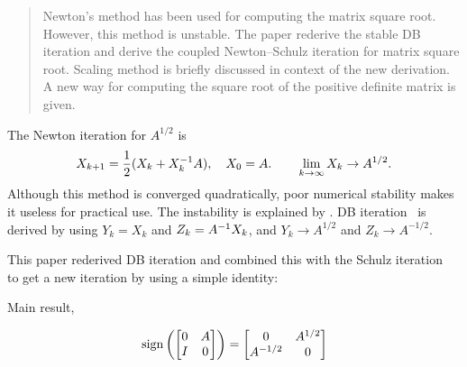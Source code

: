 \documentclass{article}
\begin{document}
\maketitle
\thispagestyle{firstpage}




\begin{abstract}
  Newton's method has been used for computing the matrix square root.
  However, this method is unstable. The paper rederive the stable DB
  iteration and derive the coupled Newton--Schulz iteration for matrix
  square root. Scaling method is briefly discussed in context of the new
  derivation. A new way for computing the square root of the positive
  definite matrix is given.
\end{abstract}



The Newton iteration for $A^{1/2}$ is
\begin{equation}\notag
  X_{k + 1} = \frac{1}{2}(X_k + X_k^{-1} A), \quad X_0 = A. \qquad 
  \lim_{k \to \infty} X_k \to A^{1/2}.
\end{equation}
Although this method is converged quadratically, poor numerical stability
makes it useless for practical use. The instability is explained by
\cite{high86nwmsqrt}. DB iteration~\cite{debe76} is derived by using
$Y_k = X_k$ and $Z_k = A^{-1} X_k$, and $Y_k \to A^{1/2}$ and
$Z_k \to A^{-1/2}$.

This paper rederived DB iteration and combined this with the Schulz
iteration~\cite{schu33} to get a new iteration by using a simple
identity:

\begin{mybox}
  \begin{center}
    \sffamily Main result, \cite[Lemma~1]{high97}
  \end{center}
  \begin{equation}\notag
    \mathrm{sign}\left(
      \begin{bmatrix} 
        0 & A \\ I & 0
      \end{bmatrix}\right) = 
    \begin{bmatrix}
      0 & A^{1/2} \\ A^{-1/2} & 0 
    \end{bmatrix}
  \end{equation}
\end{mybox}
\end{document}
